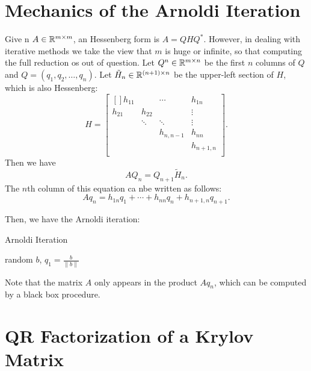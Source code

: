 \section{Mechanics of the Arnoldi Iteration} 
Give n $ A \in \mathbb{R}^{m\times m} $, an Hessenberg form is $ A= QHQ^*  $.  However, in dealing with iterative methods we take the view that $ m $ is huge or infinite, so that computing the full reduction os out of question.  Let $ Q^{n}\in \mathbb{R}^{m\times n}$ be the first $ n $ columns of $ Q $ and $ Q = (q_1,q_2,\ldots ,q_n) $.    Let $ \tilde H_n\in \mathbb{R}^{(n+1)\times n} $ be the upper-left section of $ H $, which is also Hessenberg: 
\begin{equation}
\label{eq: tilde H}
    H = \begin{bmatrix}[] 
        h_{11} &  & \cdots &    h_{1n} \\
        h_{21} & h_{ 22 }  &    &\vdots    \\
         & \ddots & \ddots &    \vdots \\
         &  & h_{n,n-1} &h_{nn}     \\
         &  &  & h_{n+1, n}    \\
    \end{bmatrix} . 
\end{equation}
 Then we have 
 \[
    AQ_n = Q_{ n+1}  \tilde H_n.  
 \]
 The $ n $th column of this equation ca nbe written as follows: 
 \begin{equation}
 \label{eq: Hessenberg form}
    Aq_n = h_{1n}q_1 +\cdots + h_{nn}q_n + h_{n+1,n}q_{n+1}. 
 \end{equation}

 Then, we have the Arnoldi iteration:

 \begin{algorithm}[H]
     \caption{Arnoldi Iteration}
     \label{Algo 33.1}
     random $ b $, $ q_1 = \frac{b}{\|b\|} $\; 
 \end{algorithm}
 
 Note that the matrix $ A $ only appears in the product $ A q_n $, which can be computed by a black box procedure. 
 
 \section{QR Factorization of a Krylov Matrix} 
  
